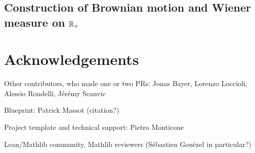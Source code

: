 \documentclass[lean]{DraftAFM}
\begin{document}
\subsection{Construction of Brownian motion and Wiener measure on $\mathbb{R}_+$}



\section{Acknowledgements}
Other contributors, who made one or two PRs: Jonas Bayer, Lorenzo Loccioli, Alessio Rondelli, Jérémy Scanvic

Blueprint: Patrick Massot (citation?)

Project template \cite{Monticone_LeanProject_2025} and technical support: Pietro Monticone

Lean/Mathlib community, Mathlib reviewers (Sébastien Gouëzel in particular?)

\printbibliography
\end{document}
